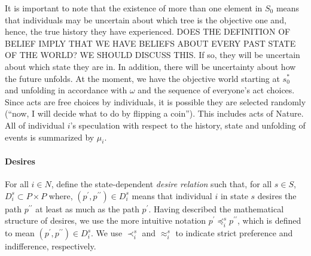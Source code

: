 \documentclass[
11pt,
titlepage,
reqno,
]{article}%
\theoremstyle{definition}
\begin{document}
	It is important to note that the existence of more than one element in $S_0$ means that individuals may be uncertain about which tree is the objective one and, hence, the true history they have experienced. 
	DOES THE DEFINITION OF BELIEF IMPLY THAT WE HAVE BELIEFS ABOUT EVERY PAST STATE OF THE WORLD? WE SHOULD DISCUSS THIS.
	If so, they will be uncertain about which state they are in. 
	In addition, there will be uncertainty about how the future unfolds. 
	At the moment, we have the objective world starting at $s_0^\ast$ and unfolding in accordance with $\omega$ and the sequence of everyone's act choices. 
	Since  acts are free choices by individuals, it is possible they are selected randomly (``now, I will decide what to do by flipping a coin'').
	This includes acts of Nature.
	All of individual $i$'s speculation with respect to the history, state and unfolding of events is summarized by $\mu_i$.
	
	\paragraph*{Desires \label{para: desires}}
	For all $i\in N$, define the state-dependent \textit{desire relation} such that, for all $s\in S$,   $D_i^s\subset P\times P$ where, $(p^\prime,p^{\prime\prime})\in D_i^s$ means that  individual $i$ in state $s$ desires the path $p^{\prime\prime}$ at least as much as the path $p^\prime$. 
	Having described the mathematical structure of desires, we use the more intuitive notation $p^\prime\preceq_i^s p^{\prime\prime}$, which is defined to mean $(p^\prime,p^{\prime\prime})\in D_i^s$. 
	We use $\prec_i^s$ and $\approx_i^s$ to indicate strict preference and indifference, respectively. 
	
\end{document}
